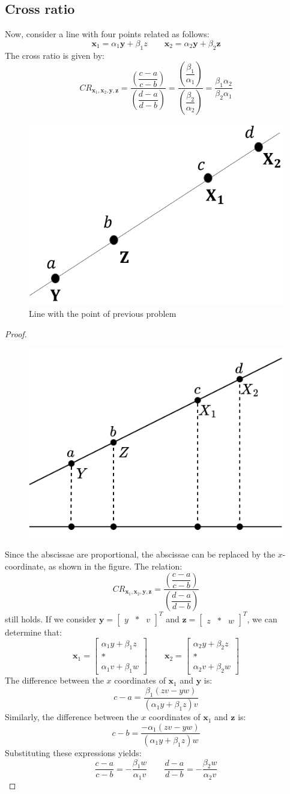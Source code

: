 \subsection{Cross ratio}
Now, consider a line with four points related as follows:
\[\mathbf{x}_1=\alpha_1\mathbf{y}+\beta_1z \qquad \mathbf{x}_2=\alpha_2\mathbf{y}+\beta_2\mathbf{z}\]
The cross ratio is given by:
\[CR_{\mathbf{x}_1,\mathbf{x}_2,\mathbf{y},\mathbf{z}}=\dfrac{\left(\dfrac{c-a}{c-b}\right)}{\left(\dfrac{d-a}{d-b}\right)}=\dfrac{\left(\dfrac{\beta_1}{\alpha_1}\right)}{\left(\dfrac{\beta_2}{\alpha_2}\right)}=\dfrac{\beta_1\alpha_2}{\beta_2\alpha_1}\]
\begin{figure}[H]
    \centering
    \includegraphics[width=0.25\linewidth]{images/line.png}
    \caption{Line with the point of previous problem}
\end{figure}
\begin{proof}  
    \begin{figure}[H]
        \centering
        \includegraphics[width=0.3\linewidth]{images/abscissae.png}
    \end{figure}
    Since the abscissae are proportional, the abscissae can be replaced by the $x$-coordinate, as shown in the figure. 
    The relation:
    \[CR_{\mathbf{x}_1,\mathbf{x}_2,\mathbf{y},\mathbf{z}}=\dfrac{\left(\dfrac{c-a}{c-b}\right)}{\left(\dfrac{d-a}{d-b}\right)}\]
    still holds. 
    If we consider $\mathbf{y}={\begin{bmatrix} y & \ast & v \end{bmatrix}}^T$ and $\mathbf{z}={\begin{bmatrix} z & \ast & w \end{bmatrix}}^T$, we can determine that:
    \[\mathbf{x}_1=\begin{bmatrix} \alpha_1y+\beta_1z \\ \ast \\ \alpha_1v+\beta_1w \end{bmatrix} \qquad \mathbf{x}_2=\begin{bmatrix} \alpha_2y+\beta_2z \\ \ast \\ \alpha_2v+\beta_2w \end{bmatrix}\]
    The difference between the $x$ coordinates of $\mathbf{x}_1$ and $\mathbf{y}$ is:
    \[c-a=\dfrac{\beta_1(zv-yw)}{(\alpha_1y+\beta_1z)v}\]
    Similarly, the difference between the $x$ coordinates of $\mathbf{x}_1$ and $\mathbf{z}$ is:
    \[c-b=\dfrac{-\alpha_1(zv-yw)}{(\alpha_1y+\beta_1z)w}\]
    Substituting these expressions yields:
    \[\dfrac{c-a}{c-b}=-\dfrac{\beta_1w}{\alpha_1v} \qquad \dfrac{d-a}{d-b}=-\dfrac{\beta_2w}{\alpha_2v}\]
\end{proof}